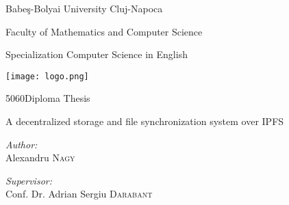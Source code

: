 \documentclass[12pt]{report}
\makeatletter
\newcommand\HUGE{\@setfontsize\Huge{50}{60}}
\makeatother
\begin{document}
 
	      		 
\begin{titlepage}

\centering 	
{\scshape{\LARGE Babeş-Bolyai University Cluj-Napoca\par}}
{\scshape{\large Faculty of Mathematics and Computer Science\par}}
{\scshape{\large Specialization Computer Science in English\par}}

\vspace{1.5cm}

\texttt{[image: logo.png]}\par

\centering 	
    
{\scshape{\HUGE Diploma Thesis\par}}
\vspace{1cm}
	
{\scshape{\Large  A decentralized storage and file synchronization system over IPFS\par}}
\vspace{2cm}
  

\large
\emph{Author:}\\
Alexandru \textsc{Nagy} \\ 

\vspace{5mm}

\large
\emph{Supervisor:} \\
Conf. Dr. Adrian Sergiu \textsc{Darabant}

 \vspace{2cm}

{\large \the\year}\\[2cm] 

\end{titlepage}

\end{document}
